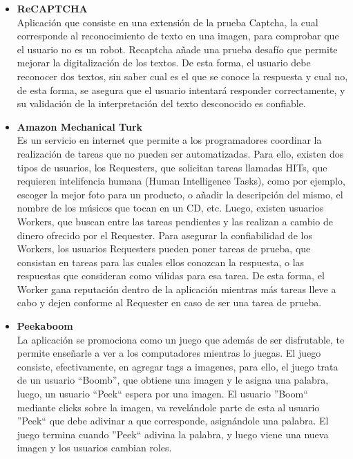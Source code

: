 \documentclass[10pt,letterpaper]{article}
\begin{document}
\begin{itemize}
 \item \textbf{ReCAPTCHA}\\

Aplicación que consiste en una extensión de la prueba Captcha, la cual corresponde al reconocimiento de texto en una imagen, para comprobar que el usuario no es un robot. Recaptcha añade una prueba desafío que permite mejorar la digitalización de los textos. De esta forma, el usuario debe reconocer dos textos, sin saber cual es el que se conoce la respuesta y cual no, de esta forma, se asegura que el usuario intentará responder correctamente, y su validación de la interpretación del texto desconocido es confiable.\\

 \item \textbf{Amazon Mechanical Turk}\\

Es un servicio en internet que permite a los programadores coordinar la realización de tareas que no pueden ser automatizadas. Para ello, existen dos tipos de usuarios, los Requesters, que solicitan tareas llamadas HITs, que requieren intelifencia humana (Human Intelligence Tasks), como por ejemplo, escoger la mejor foto para un producto, o añadir la descripción del mismo, el nombre de los músicos que tocan en un CD, etc. Luego, existen usuarios Workers, que buscan entre las tareas pendientes y las realizan a cambio de dinero ofrecido por el Requester. Para asegurar la confiabilidad de los Workers, los usuarios Requesters pueden poner tareas de prueba, que consistan en tareas para las cuales ellos conozcan la respuesta, o las respuestas que consideran como válidas para esa tarea. De esta forma, el Worker gana reputación dentro de la aplicación mientras más tareas lleve a cabo y dejen conforme al Requester en caso de ser una tarea de prueba.

\item \textbf{Peekaboom}\\

La aplicación se promociona como un juego que además de ser disfrutable, te permite  enseñarle a ver a los computadores mientras lo juegas. El juego consiste, efectivamente, en agregar tags a imagenes, para ello, el juego trata de un usuario ``Boomb'', que obtiene una imagen y le asigna una palabra, luego, un usuario ``Peek`` espera por una imagen. El usuario ''Boom`` mediante clicks sobre la imagen, va revelándole parte de esta al usuario ''Peek`` que debe adivinar a que corresponde, asignándole una palabra. El juego termina cuando ''Peek`` adivina la palabra, y luego viene una nueva imagen y los usuarios cambian roles.
\end{itemize}
\end{document}
